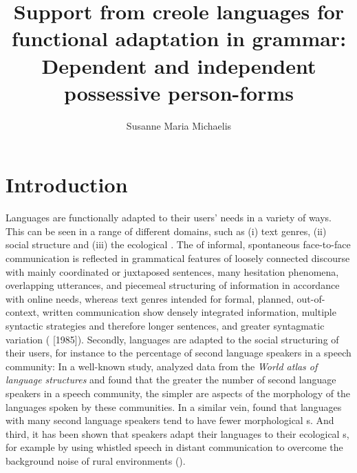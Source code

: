 \documentclass[output=paper]{langsci/langscibook}
\author{Susanne Maria Michaelis\affiliation{Leipzig University \& Max Planck Institute for the Science of Human History (Jena)}}
\title{Support from creole languages for functional adaptation in grammar: Dependent and independent possessive {person}-forms}
\begin{document}
\maketitle {}




\section{Introduction}

Languages are functionally adapted to their users’ needs in a variety of ways. This can be seen in a range of different domains, such as (i) text genres, (ii) social structure and (iii) the ecological . The  of informal, spontaneous face-to-face communication is reflected in grammatical features of loosely connected discourse with mainly coordinated or juxtaposed sentences, many hesitation phenomena, overlapping utterances, and piecemeal structuring of information in accordance with online  needs, whereas text genres intended for formal, planned, out-of-context, written communication show densely integrated information, multiple syntactic  strategies and therefore longer sentences, and greater syntagmatic variation (\citealt{KochOesterreicher2012} [1985]). Secondly, languages are adapted to the social structuring of their users, for instance to the percentage of second language speakers in a speech community: In a well-known study, \citet{LupyanDale2010} analyzed data from the \textit{World atlas of language structures} \citep{HaspelmathEtAl2005} and found that the greater the number of second language speakers in a speech community, the simpler are aspects of the morphology of the languages spoken by these communities. In a similar vein, \citet{BentzWinter2013} found that languages with many second language speakers tend to have fewer morphological s. And third, it has been shown that speakers adapt their languages to their ecological s, for example by using whistled speech in distant communication to overcome the background noise of rural environments (\citealt{Meyer2005,Meyer2008}). 
\end{document}
